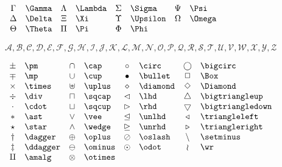\documentclass{article}
\begin{document}
    \begin{math}
        \begin{array}{clclclcl}
            \Gamma & \verb=\Gamma= & \Lambda & \verb=\Lambda= & \Sigma & \verb=\Sigma= & \Psi & \verb=\Psi= \\
            \Delta & \verb=\Delta= & \Xi & \verb=\Xi= & \Upsilon & \verb=\Upsilon= & \Omega & \verb=\Omega= \\
            \Theta & \verb=\Theta= & \Pi & \verb=\Pi= & \Phi & \verb=\Phi= \\
        \end{array}
    \end{math}

    \begin{math}
        \mathcal{A,B,C,D,E,F,G,H,I,J,K,L,M,N,O,P,Q,R,S,T,U,V,W,X,Y,Z}
    \end{math}

    \begin{math}
        \begin{array}{clclclcl}
            \pm & \verb=\pm= & \cap & \verb=\cap= & \circ & \verb=\circ= & \bigcirc & \verb=\bigcirc= \\
            \mp & \verb=\mp= & \cup & \verb=\cup= & \bullet & \verb=\bullet= & \Box & \verb=\Box= \\
            \times & \verb=\times= & \uplus & \verb=\uplus= & \diamond & \verb=\diamond= & \Diamond & \verb=\Diamond= \\
            \div & \verb=\div= & \sqcap & \verb=\sqcap= & \lhd & \verb=\lhd=  & \bigtriangleup & \verb=\bigtriangleup= \\
            \cdot & \verb=\cdot= & \sqcup & \verb=\sqcup= & \rhd & \verb=\rhd=  & \bigtriangledown & \verb=\bigtriangledown= \\
            \ast & \verb=\ast= & \vee & \verb=\vee= & \unlhd & \verb=\unlhd=  & \triangleleft & \verb=\triangleleft= \\
            \star & \verb=\star= & \wedge & \verb=\wedge= & \unrhd & \verb=\unrhd=  & \triangleright & \verb=\triangleright= \\
            \dagger & \verb=\dagger= & \oplus & \verb=\oplus= & \oslash & \verb=\oslash=  & \setminus & \verb=\setminus= \\
            \ddagger & \verb=\ddagger= & \ominus & \verb=\ominus= & \odot & \verb=\odot=  & \wr & \verb=\wr= \\
            \amalg & \verb=\amalg= & \otimes & \verb=\otimes= \\
        \end{array}
    \end{math}
\end{document}
